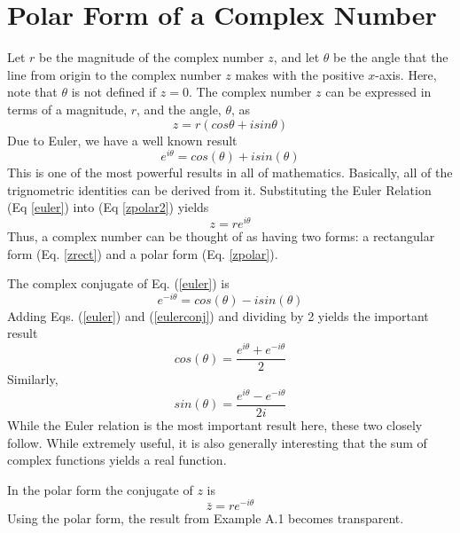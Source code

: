 \section{Polar Form of a Complex Number}
Let $r$ be the magnitude of  the complex number 
$z$, and let $\theta$ be the angle that the line from origin to the complex number $z$ makes with the positive $x$-axis. Here, note that $\theta$ is
not defined if $z=0$. The complex number $z$
can be expressed in terms of a magnitude, $r$,  and the  angle, $\theta$, as
\begin{equation}
z = r (cos \theta  + i sin\theta)
\label{zpolar2}
\end{equation}
 Due to Euler, we have a well known result
\begin{equation}
e^{i \theta} = cos(\theta ) + i sin(\theta )
\label{euler}
\end{equation}
This is one of the most powerful results in
all of mathematics.  Basically, all of the
trignometric identities can be derived from it.
Substituting the Euler Relation (Eq 
\ref{euler}) into (Eq \ref{zpolar2}) yields
\begin{equation}
z = r e^{i \theta}
\label{zpolar}
\end{equation}
Thus, a complex number can be thought of as having two forms:  
a rectangular form (Eq. \ref{zrect}) and a polar form (Eq. \ref{zpolar}).  

The complex conjugate of Eq. (\ref{euler}) is
\begin{equation}
e^{-i \theta}= cos(\theta ) - i sin(\theta )
\label{eulerconj}
\end{equation}
Adding Eqs. (\ref{euler}) and (\ref{eulerconj}) and dividing by 2 yields the 
important result
\begin{equation}
cos(\theta ) = \frac {e^{i \theta} + e^{-i \theta}}{2}
\label{cos}
\end{equation}
Similarly,
\begin{equation}
sin( \theta ) = \frac {e^{i \theta} - e^{-i \theta}}{2i}
\label{sin}
\end{equation}
While the Euler relation is the most important result
here, these two closely follow.  While extremely useful,
it is also generally interesting that the sum of complex
functions yields a real function.

In the polar form the conjugate of $z$ is
\begin{equation}
\bar{z} = r e^{-i \theta}
\label{zconjpolar}
\end{equation}
Using the polar form, the result from Example A.1 becomes 
transparent.

